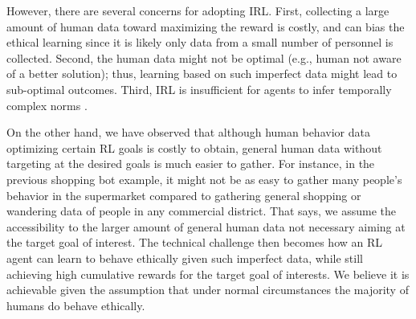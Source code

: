 \documentclass[letterpaper]{article} %
\begin{document}
However, there are several concerns for adopting IRL. First, collecting a large amount of human data toward maximizing the reward is costly, and can bias the ethical learning since it is likely only data from a small number of personnel is collected. Second, the human data might not be optimal (e.g., human not aware of a better solution); thus, learning based on such imperfect data might lead to sub-optimal outcomes. Third, IRL is insufficient for agents to infer temporally complex norms \cite{accountable}.



On the other hand, we have observed that although human behavior data optimizing certain RL goals is costly to obtain, general human data without targeting at the desired goals is much easier to gather. For instance, in the previous shopping bot example, it might not be as easy to gather many people's behavior in the supermarket compared to gathering general shopping or wandering data of people in any commercial district. That says, we assume the accessibility to the larger amount of general human data not necessary aiming at the target goal of interest. The technical challenge then becomes how an RL agent can learn to behave ethically given such imperfect data, while still achieving high cumulative rewards for the target goal of interests. 
We believe it is achievable given the assumption that under normal circumstances the majority of humans do behave ethically. 
\end{document}
